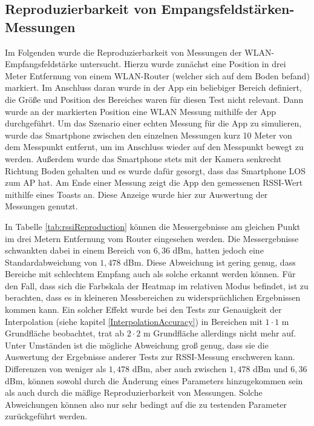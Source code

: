 \documentclass[10pt]{scrartcl}
\begin{document}
\subsection{Reproduzierbarkeit von Empangsfeldstärken-Messungen}
\label{reproductability}
Im Folgenden wurde die Reproduzierbarkeit von Messungen der WLAN-Empfangsfeldstärke untersucht. Hierzu wurde zunächst eine Position in drei Meter Entfernung von einem WLAN-Router (welcher sich auf dem Boden befand) markiert. Im Anschluss daran wurde in der App ein beliebiger Bereich definiert, die Größe und Position des Bereiches waren für diesen Test nicht relevant. Dann wurde an der markierten Position eine WLAN Messung mithilfe der App durchgeführt. Um das Szenario einer echten Messung für die App zu simulieren, wurde das Smartphone zwischen den einzelnen Messungen kurz 10 Meter von dem Messpunkt entfernt, um im Anschluss wieder auf den Messpunkt bewegt zu werden. Außerdem wurde das Smartphone stets mit der Kamera senkrecht Richtung Boden gehalten und es wurde dafür gesorgt, dass das Smartphone LOS zum AP hat. Am Ende einer Messung zeigt die App den gemessenen RSSI-Wert mithilfe eines Toasts an. Diese Anzeige wurde hier zur Auswertung der Messungen genutzt.

In Tabelle \ref{tab:rssiReproduction} können die Messergebnisse am gleichen Punkt im drei Metern Entfernung vom Router eingesehen werden. Die Messergebnisse schwankten dabei in einem Bereich von $6,36$ dBm, hatten jedoch eine Standardabweichung von $1,478$ dBm. Diese Abweichung ist gering genug, dass Bereiche mit schlechtem Empfang auch als solche erkannt werden können. Für den Fall, dass sich die Farbskala der Heatmap im relativen Modus befindet, ist zu berachten, dass es in kleineren Messbereichen zu widersprüchlichen Ergebnissen kommen kann. Ein solcher Effekt wurde bei den Tests zur Genauigkeit der Interpolation (siehe kapitel \ref{InterpolationAccuracy}) in Bereichen mit $1\cdot 1$ m Grundfläche beobachtet, trat ab $2\cdot 2$ m Grundfläche allerdings nicht mehr auf.
Unter Umständen ist die mögliche Abweichung groß genug, dass sie die Auswertung der Ergebnisse anderer Tests zur RSSI-Messung erschweren kann. Differenzen von weniger als $1,478$ dBm, aber auch zwischen $1,478$ dBm und $6,36$ dBm, können sowohl durch die Änderung eines Parameters hinzugekommen sein als auch durch die mäßige Reproduzierbarkeit von Messungen. Solche Abweichungen können also nur sehr bedingt auf die zu testenden Parameter zurückgeführt werden.
\end{document}
